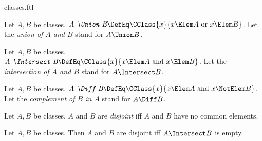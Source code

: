 \documentclass{stex}
\begin{document}
\begin{smodule}{classes.ftl}
\begin{definition*}[forthel,for={Union,union}]
  Let $A, B$ be classes.
  $\emph{A \Union B} \DefEq \CClass{x}{x \Elem A\text{ or }x \Elem B}$.
  Let the \emph{union of $A$ and $B$} stand for $A \Union B$.
\end{definition*}

\begin{definition*}[forthel,for={Intersect,intersection}]
  Let $A, B$ be classes.
  $\emph{A \Intersect B} \DefEq \CClass{x}{x \Elem A\text{ and }x \Elem B}$.
  Let the \emph{intersection of $A$ and $B$} stand for $A \Intersect B$.
\end{definition*}

\begin{definition*}[forthel,for={Diff,complement}]
  Let $A, B$ be classes.
  $\emph{A \Diff B} \DefEq \CClass{x}{x \Elem A\text{ and }x \NotElem B}$.
  Let the \emph{complement of $B$ in $A$} stand for $A \Diff B$.
\end{definition*}

\begin{definition*}[forthel,for=disjoint]
  Let $A, B$ be classes.
  $A$ and $B$ are \emph{disjoint} iff $A$ and $B$ have no common elements.
\end{definition*}

\begin{proposition*}[forthel]
  Let $A, B$ be classes.
  Then $A$ and $B$ are disjoint iff $A \Intersect B$ is empty.
\end{proposition*}

\end{smodule}
\end{document}

